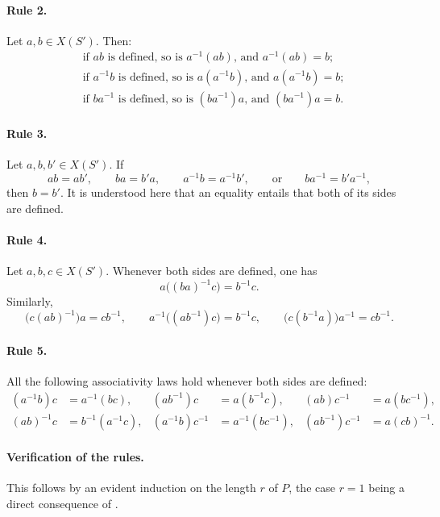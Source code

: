 \paragraph{Rule 2.}
Let \(a,b\in X(S')\). Then:
\begin{align*}
  &\text{if \(ab\) is defined, so is \(a^{-1}(ab)\), and }
    a^{-1}(ab)=b;\\
  &\text{if \(a^{-1}b\) is defined, so is \(a(a^{-1}b)\), and }
    a(a^{-1}b)=b;\\
  &\text{if \(ba^{-1}\) is defined, so is \((ba^{-1})a\), and }
    (ba^{-1})a=b.
\end{align*}

\paragraph{Rule 3.}
Let \(a,b,b'\in X(S')\). If
\[
  ab=ab',\qquad ba=b'a,\qquad a^{-1}b=a^{-1}b',
  \qquad\text{or}\qquad ba^{-1}=b'a^{-1},
\]
then \(b=b'\). It is understood here that an equality entails that
both of its sides are defined.

\paragraph{Rule 4.}
Let \(a,b,c\in X(S')\). Whenever both sides are defined, one has
\[
  a\bigl((ba)^{-1}c\bigr)=b^{-1}c.
\]
Similarly,
\[
  \bigl(c(ab)^{-1}\bigr)a=cb^{-1},\qquad
  a^{-1}\bigl((ab^{-1})c\bigr)=b^{-1}c,\qquad
  \bigl(c(b^{-1}a)\bigr)a^{-1}=cb^{-1}.
\]

\paragraph{Rule 5.}
All the following associativity laws hold whenever both sides are
defined:
\[
\begin{aligned}
  (a^{-1}b)c&=a^{-1}(bc),&
  (ab^{-1})c&=a(b^{-1}c),&
  (ab)c^{-1}&=a(bc^{-1}),\\
  (ab)^{-1}c&=b^{-1}(a^{-1}c),&
  (a^{-1}b)c^{-1}&=a^{-1}(bc^{-1}),&
  (ab^{-1})c^{-1}&=a(cb)^{-1}.
\end{aligned}
\]

\paragraph{Verification of the rules.}
\textup{} This follows by an evident induction on the length
\(r\) of \(P\), the case \(r=1\) being a direct consequence of
.

